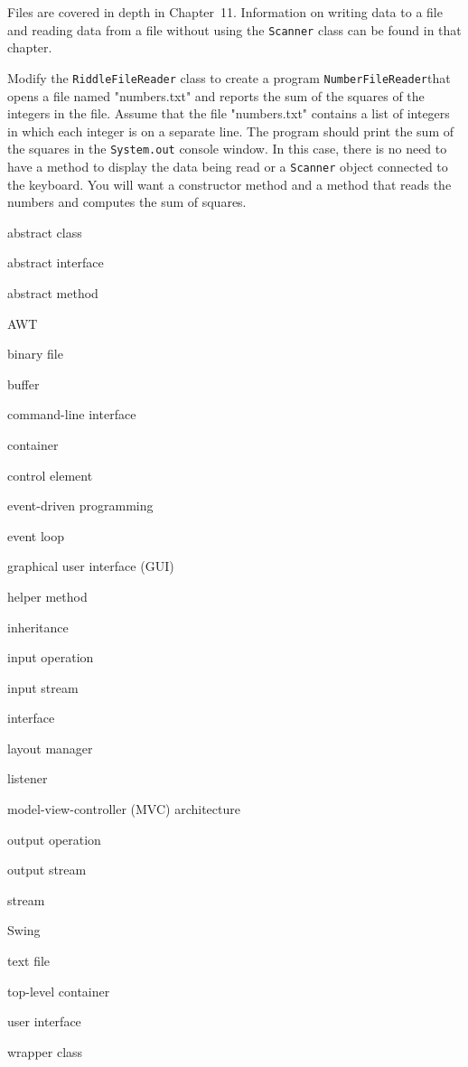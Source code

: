 Files are covered in depth in Chapter~11. Information on writing data to a file 
and reading data from a file without using the {\tt Scanner} class can be found in
that chapter.


\begin{SSTUDY}

\item Modify the {\tt RiddleFileReader} class to create a program 
{\tt NumberFileReader}that opens
a file named "numbers.txt" and reports the sum of the squares of the integers 
in the file.  Assume that the file "numbers.txt" contains a list of integers 
in which each integer is on a separate line. The program should print the
sum of the squares in the {\tt System.out} console window. In this case, 
there is no need to have a method to display the data being read or
a {\tt Scanner} object connected to the keyboard.  You will want a constructor
method and a method that reads the numbers and computes the sum of squares.

\end{SSTUDY}

\begin{KT}

abstract class

abstract interface

abstract method

AWT

binary file

buffer

command-line interface

container

control element

event-driven programming

event loop 

graphical user interface (GUI)

helper method

inheritance

input operation

input stream

interface

layout manager

listener

model-view-controller (MVC) architecture

output operation

output stream

stream

Swing

text file

top-level container

user interface

wrapper class
\end{KT}

